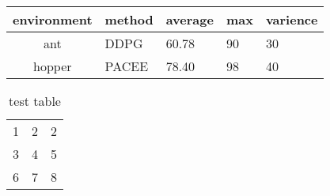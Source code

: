 \documentclass{article}
\begin{document}
\begin{tabular}{c l l l p{1.5cm}}
  \hline\hline
  environment & method & average & max & varience  \\
  \hline
  ant & DDPG & 60.78 & 90 & 30 \\
  hopper & PACEE & 78.40 & 98 & 40\\
  \hline
\end{tabular}
\begin{table}
  \centering
  \caption{test table}\label{test}
  \begin{tabular}{|l|c|c|}
    \hline
    1& 2 & 2 \\
    3 & 4 & 5 \\
    6 & 7& 8 \\
    \hline
  \end{tabular}
  
\end{table}
\end{document}
